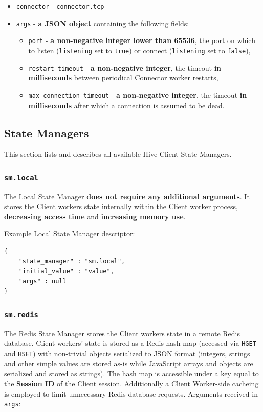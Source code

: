 \documentclass[a4paper]{article}
\begin{document}
\begin{itemize}
\item \texttt{connector} - \texttt{connector.tcp}
\item \texttt{args} - \textbf{a JSON object} containing the following fields:
\begin{itemize}
\item \texttt{port} - \textbf{a non-negative integer lower than 65536}, the port on which to listen (\texttt{listening} set to \texttt{true}) or connect (\texttt{listening} set to \texttt{false}),
\item \texttt{restart\_timeout} - \textbf{a non-negative integer}, the timeout \textbf{in milliseconds} between periodical Connector worker restarts,
\item \texttt{max\_connection\_timeout} - \textbf{a non-negative integer}, the timeout \textbf{in milliseconds} after which a connection is assumed to be dead.
\end{itemize}
\end{itemize}
\subsection{State Managers}
\label{sec-8-5}
\label{ref-state_managers}

This section lists and describes all available Hive Client State Managers.
\subsubsection{\texttt{sm.local}}
\label{sec-8-5-1}

The Local State Manager \textbf{does not require any additional arguments}. It stores the Client workers state internally within the Client worker process, \textbf{decreasing access time} and \textbf{increasing memory use}.

\noindent
Example Local State Manager descriptor:

\begin{verbatim}
{
    "state_manager" : "sm.local",
    "initial_value" : "value",
    "args" : null
}
\end{verbatim}
\subsubsection{\texttt{sm.redis}}
\label{sec-8-5-2}

The Redis State Manager stores the Client workers state in a remote Redis database. Client workers' state is stored as a Redis hash map (accessed via \texttt{HGET} and \texttt{HSET}) with non-trivial objects serialized to JSON format (integers, strings and other simple values are stored as-is while JavaScript arrays and objects are serialized and stored as strings). The hash map is accessible under a key equal to the \textbf{Session ID} of the Client session. Additionally a Client Worker-side cacheing is employed to limit unnecessary Redis database requests. Arguments received in \texttt{args}:
\end{document}
